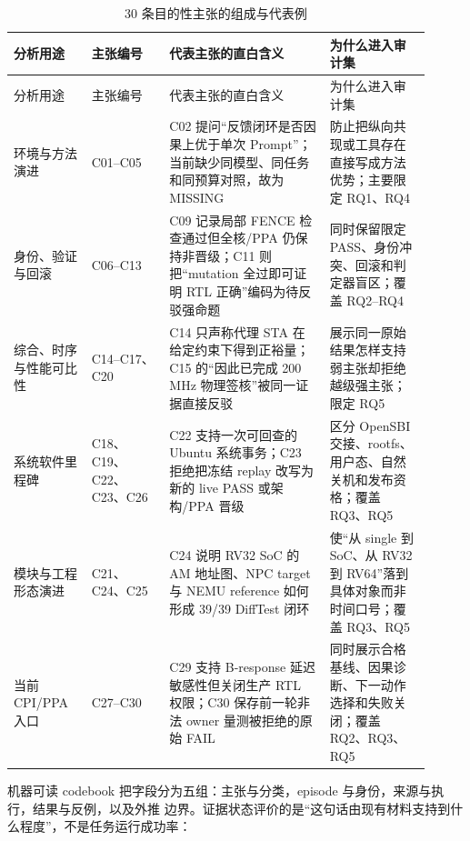 \documentclass[UTF8,a4paper,zihao=-4,oneside]{ctexart}
\begin{document}
\begingroup
\small
\setlength{\LTpre}{0.5em}
\setlength{\LTpost}{0.5em}
\begin{longtable}{@{}L{0.17\linewidth}L{0.17\linewidth}L{0.35\linewidth}L{0.22\linewidth}@{}}
  \caption{30 条目的性主张的组成与代表例}\label{tab:claim-set-examples}\\
  \toprule
  分析用途 & 主张编号 & 代表主张的直白含义 & 为什么进入审计集 \\
  \midrule
  \endfirsthead
  \toprule
  分析用途 & 主张编号 & 代表主张的直白含义 & 为什么进入审计集 \\
  \midrule
  \endhead
  环境与方法演进 & C01--C05 & C02 提问“反馈闭环是否因果上优于单次 Prompt”；当前缺少同模型、同任务和同预算对照，故为 MISSING & 防止把纵向共现或工具存在直接写成方法优势；主要限定 RQ1、RQ4 \\
  身份、验证与回滚 & C06--C13 & C09 记录局部 FENCE 检查通过但全核/PPA 仍保持非晋级；C11 则把“mutation 全过即可证明 RTL 正确”编码为待反驳强命题 & 同时保留限定 PASS、身份冲突、回滚和判定器盲区；覆盖 RQ2--RQ4 \\
  综合、时序与性能可比性 & C14--C17、C20 & C14 只声称代理 STA 在给定约束下得到正裕量；C15 的“因此已完成 200\,MHz 物理签核”被同一证据直接反驳 & 展示同一原始结果怎样支持弱主张却拒绝越级强主张；限定 RQ5 \\
  系统软件里程碑 & C18、C19、C22、C23、C26 & C22 支持一次可回查的 Ubuntu 系统事务；C23 拒绝把冻结 replay 改写为新的 live PASS 或架构/PPA 晋级 & 区分 OpenSBI 交接、rootfs、用户态、自然关机和发布资格；覆盖 RQ3、RQ5 \\
  模块与工程形态演进 & C21、C24、C25 & C24 说明 RV32 SoC 的 AM 地址图、NPC target 与 NEMU reference 如何形成 39/39 DiffTest 闭环 & 使“从 single 到 SoC、从 RV32 到 RV64”落到具体对象而非时间口号；覆盖 RQ3、RQ5 \\
  当前 CPI/PPA 入口 & C27--C30 & C29 支持 B-response 延迟敏感性但关闭生产 RTL 权限；C30 保存前一轮非法 owner 量测被拒绝的原始 FAIL & 同时展示合格基线、因果诊断、下一动作选择和失败关闭；覆盖 RQ2、RQ3、RQ5 \\
  \bottomrule
\end{longtable}
\endgroup

机器可读 codebook 把字段分为五组：主张与分类，episode 与身份，来源与执行，结果与反例，以及外推
边界。证据状态评价的是“这句话由现有材料支持到什么程度”，不是任务运行成功率：
\end{document}
